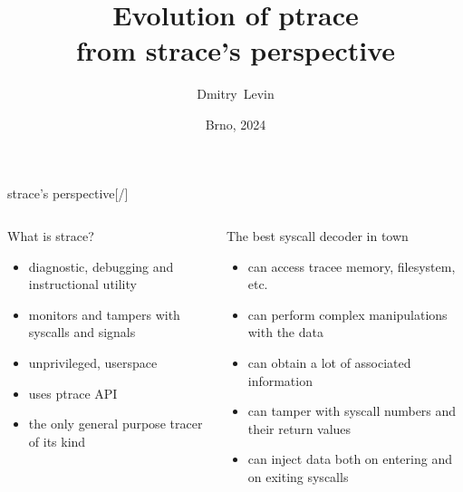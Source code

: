 \documentclass[unicode,aspectratio=169,xcolor={table,dvipsnames,usenames}]{beamer}
\title{\Huge Evolution of ptrace \\ from strace's perspective}
\author{\LARGE Dmitry~Levin}
\date{\Large Brno, 2024}
\begin{document}
\begin{frame}[noframenumbering]
\titlepage
\end{frame}

{
\begin{frame}{\Large strace's perspective\hfill [\insertframenumber/\inserttotalframenumber]}
	\begin{columns}
		\column{10cm}
\begin{block}{What is strace?}
\begin{itemize}
	\item diagnostic, debugging and instructional utility
	\item monitors and tampers with syscalls and signals
	\item unprivileged, userspace
	\item uses ptrace API
	\item the only general purpose tracer of its kind
\end{itemize}
\end{block}

\begin{block}{The best syscall decoder in town}
\begin{itemize}
	\item can access tracee memory, filesystem, etc.
	\item can perform complex manipulations with the data
	\item can obtain a lot of associated information
	\item can tamper with syscall numbers and their return values
	\item can inject data both on entering and on exiting syscalls
\end{itemize}
\end{block}
		\column{2cm}
			\centerline{}
	\end{columns}
\end{frame}
}
\end{document}
